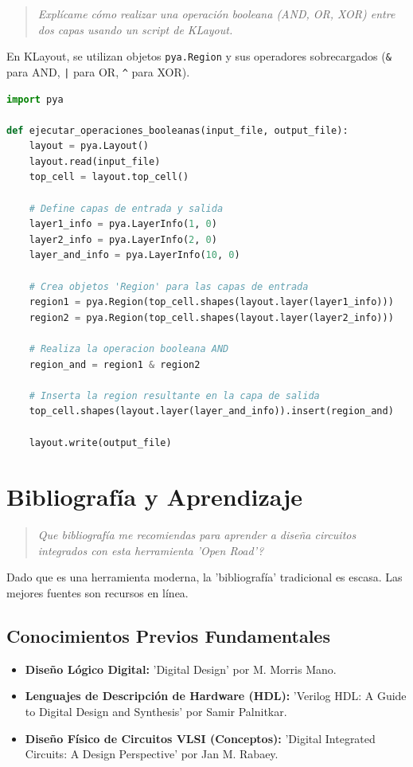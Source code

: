 \documentclass[12pt,a4paper]{article}
\newenvironment{pregunta}
  {\begin{leftbar}\begin{quote}\itshape}
  {\end{quote}\end{leftbar}}
\begin{document}
\begin{pregunta}
Explícame cómo realizar una operación booleana (AND, OR, XOR) entre dos capas usando un script de KLayout.
\end{pregunta}

En KLayout, se utilizan objetos \texttt{pya.Region} y sus operadores sobrecargados (\texttt{\&} para AND, \texttt{|} para OR, \texttt{\^} para XOR).
\begin{lstlisting}[language=Python]
import pya

def ejecutar_operaciones_booleanas(input_file, output_file):
    layout = pya.Layout()
    layout.read(input_file)
    top_cell = layout.top_cell()
    
    # Define capas de entrada y salida
    layer1_info = pya.LayerInfo(1, 0)
    layer2_info = pya.LayerInfo(2, 0)
    layer_and_info = pya.LayerInfo(10, 0)
    
    # Crea objetos 'Region' para las capas de entrada
    region1 = pya.Region(top_cell.shapes(layout.layer(layer1_info)))
    region2 = pya.Region(top_cell.shapes(layout.layer(layer2_info)))

    # Realiza la operacion booleana AND
    region_and = region1 & region2

    # Inserta la region resultante en la capa de salida
    top_cell.shapes(layout.layer(layer_and_info)).insert(region_and)
    
    layout.write(output_file)
\end{lstlisting}

\newpage
\section{Bibliografía y Aprendizaje}

\begin{pregunta}
Que bibliografía me recomiendas para aprender a diseña circuitos integrados con esta herramienta 'Open Road'?
\end{pregunta}

Dado que es una herramienta moderna, la 'bibliografía' tradicional es escasa. Las mejores fuentes son recursos en línea.

\subsection{Conocimientos Previos Fundamentales}
\begin{itemize}
    \item \textbf{Diseño Lógico Digital:} 'Digital Design' por M. Morris Mano.
    \item \textbf{Lenguajes de Descripción de Hardware (HDL):} 'Verilog HDL: A Guide to Digital Design and Synthesis' por Samir Palnitkar.
    \item \textbf{Diseño Físico de Circuitos VLSI (Conceptos):} 'Digital Integrated Circuits: A Design Perspective' por Jan M. Rabaey.
\end{itemize}
\end{document}
